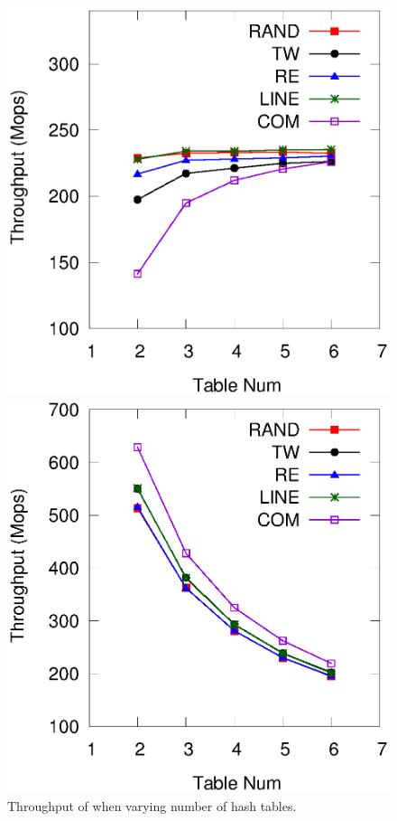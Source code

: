 \begin{figure}[h]
\begin{minipage}{0.48\linewidth}\centering
	\includegraphics[width=\linewidth]{pic/tunning/tunning-insert.eps}
	\centerline{}
	\end{minipage}
	\hfill
	\begin{minipage}{0.48\linewidth}\centering
	\includegraphics[width=\linewidth]{pic/tunning/tunning-search.eps}
	\centerline{}
	\end{minipage}
	\caption{Throughput of \voter when varying number of hash tables.}
	\label{fig:vary-table}
\end{figure}

